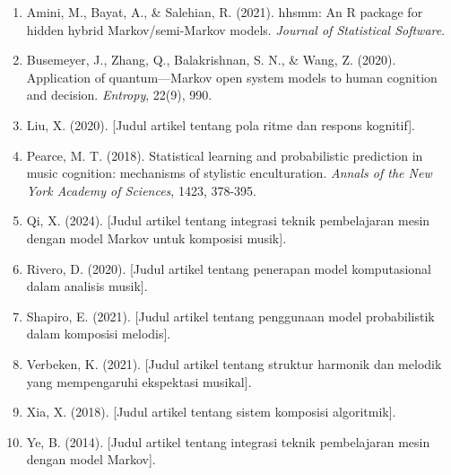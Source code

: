 \documentclass[a4paper,12pt]{article}
\begin{document}
\begin{enumerate}
    \item Amini, M., Bayat, A., \& Salehian, R. (2021). hhsmm: An R package for hidden hybrid Markov/semi-Markov models. \textit{Journal of Statistical Software}. 
    
    \item Busemeyer, J., Zhang, Q., Balakrishnan, S. N., \& Wang, Z. (2020). Application of quantum—Markov open system models to human cognition and decision. \textit{Entropy}, 22(9), 990.
    
    \item Liu, X. (2020). [Judul artikel tentang pola ritme dan respons kognitif]. 
    
    \item Pearce, M. T. (2018). Statistical learning and probabilistic prediction in music cognition: mechanisms of stylistic enculturation. \textit{Annals of the New York Academy of Sciences}, 1423, 378-395.
    
    \item Qi, X. (2024). [Judul artikel tentang integrasi teknik pembelajaran mesin dengan model Markov untuk komposisi musik].
    
    \item Rivero, D. (2020). [Judul artikel tentang penerapan model komputasional dalam analisis musik].
    
    \item Shapiro, E. (2021). [Judul artikel tentang penggunaan model probabilistik dalam komposisi melodis].
    
    \item Verbeken, K. (2021). [Judul artikel tentang struktur harmonik dan melodik yang mempengaruhi ekspektasi musikal].
    
    \item Xia, X. (2018). [Judul artikel tentang sistem komposisi algoritmik].
    
    \item Ye, B. (2014). [Judul artikel tentang integrasi teknik pembelajaran mesin dengan model Markov].
\end{enumerate}
\end{document}
